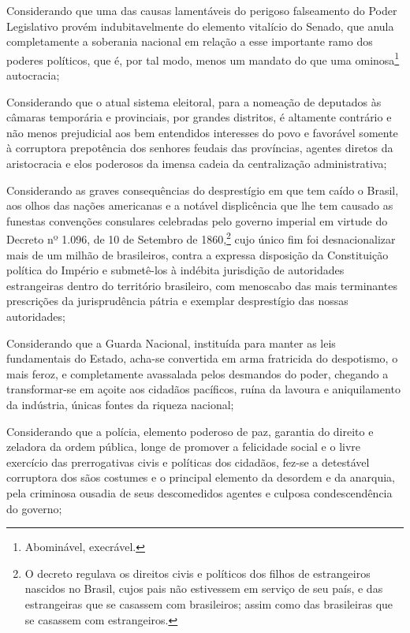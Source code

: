 Considerando que uma das causas lamentáveis do perigoso falseamento do
Poder Legislativo provém indubitavelmente do elemento vitalício do
Senado, que anula completamente a soberania nacional em relação a esse
importante ramo dos poderes políticos, que é, por tal modo, menos um
mandato do que uma ominosa\footnote{Abominável, execrável.}
autocracia;

Considerando que o atual sistema eleitoral, para a nomeação de deputados
às câmaras temporária e provinciais, por grandes distritos, é altamente
contrário e não menos prejudicial aos bem entendidos interesses do povo
e favorável somente à corruptora prepotência dos senhores feudais das
províncias, agentes diretos da aristocracia e elos poderosos da imensa
cadeia da centralização administrativa;

Considerando as graves consequências do desprestígio em que tem caído o
Brasil, aos olhos das nações americanas e a notável displicência que lhe
tem causado as funestas convenções consulares celebradas pelo governo
imperial em virtude do Decreto nº 1.096, de 10 de Setembro de
1860,\footnote{O decreto regulava os direitos civis e políticos dos
  filhos de estrangeiros nascidos no Brasil, cujos pais não estivessem
  em serviço de seu país, e das estrangeiras que se casassem com
  brasileiros; assim como das brasileiras que se casassem com
  estrangeiros.} cujo único fim foi desnacionalizar mais de um milhão de
brasileiros, contra a expressa disposição da Constituição política do
Império e submetê-los à indébita jurisdição de autoridades estrangeiras
dentro do território brasileiro, com menoscabo das mais terminantes
prescrições da jurisprudência pátria e exemplar desprestígio das nossas
autoridades;

Considerando que a Guarda Nacional, instituída para manter as leis
fundamentais do Estado, acha-se convertida em arma fratricida do
despotismo, o mais feroz, e completamente avassalada pelos desmandos do
poder, chegando a transformar-se em açoite aos cidadãos pacíficos, ruína
da lavoura e aniquilamento da indústria, únicas fontes da riqueza
nacional;

Considerando que a polícia, elemento poderoso de paz, garantia do
direito e zeladora da ordem pública, longe de promover a felicidade
social e o livre exercício das prerrogativas civis e políticas dos
cidadãos, fez-se a detestável corruptora dos sãos costumes e o principal
elemento da desordem e da anarquia, pela criminosa ousadia de seus
descomedidos agentes e culposa condescendência do governo;

